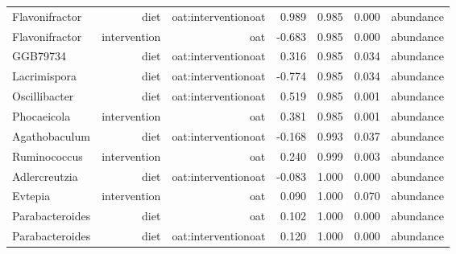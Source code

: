 \documentclass[
]{article}
\begin{document}
\begin{longtable}[t]{lrrrrrr}
Flavonifractor & diet & oat:interventionoat & 0.989 & 0.985 & 0.000 & abundance\\
Flavonifractor & intervention & oat & -0.683 & 0.985 & 0.000 & abundance\\
GGB79734 & diet & oat:interventionoat & 0.316 & 0.985 & 0.034 & abundance\\
Lacrimispora & diet & oat:interventionoat & -0.774 & 0.985 & 0.034 & abundance\\
\addlinespace
Oscillibacter & diet & oat:interventionoat & 0.519 & 0.985 & 0.001 & abundance\\
Phocaeicola & intervention & oat & 0.381 & 0.985 & 0.001 & abundance\\
Agathobaculum & diet & oat:interventionoat & -0.168 & 0.993 & 0.037 & abundance\\
Ruminococcus & intervention & oat & 0.240 & 0.999 & 0.003 & abundance\\
Adlercreutzia & diet & oat:interventionoat & -0.083 & 1.000 & 0.000 & abundance\\
\addlinespace
Evtepia & intervention & oat & 0.090 & 1.000 & 0.070 & abundance\\
Parabacteroides & diet & oat & 0.102 & 1.000 & 0.000 & abundance\\
Parabacteroides & diet & oat:interventionoat & 0.120 & 1.000 & 0.000 & abundance\\*
\end{longtable}
\end{document}
